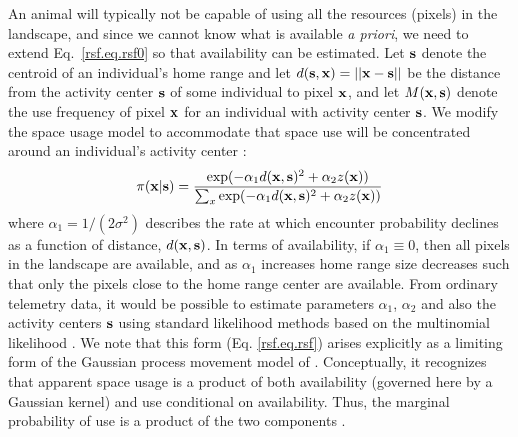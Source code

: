 \documentclass[12pt]{article}
\begin{document}
An animal will typically not be capable of using all the
resources (pixels) in the landscape, and since we cannot know what is
available \textit{a priori}, we need to extend
Eq.~\ref{rsf.eq.rsf0} so that availability can be estimated.
Let ${\bf s}$ denote the
centroid of an individual's home range and let $d({\bf s},{\bf x}) =
||{\bf x} - {\bf s}||$ be the distance from the activity center
${\bf s}$ of some individual to pixel ${\bf x}$, and let $M({\bf
  x},{\bf s})$ denote the use frequency of pixel ${\bf x}$ for an
individual with activity center ${\bf s}$.  We modify the space usage
model to accommodate that space use will be concentrated around an
individual's activity center 
\citep{johnson_etal:2008,forester_etal:2009}:
\begin{equation}
 \pi({\bf x}|{\bf s})  = \frac{ \exp( -\alpha_{1} d({\bf x},{\bf s})^{2} +\alpha_{2} z({\bf x}) )}
{ \sum_{x} \exp(-\alpha_{1} d({\bf x},{\bf s})^{2} +\alpha_{2} z({\bf x}))}
\label{rsf.eq.rsf}
\end{equation}
where $\alpha_1=1/(2\sigma^2)$ describes the rate at which encounter
probability declines as a function of distance, $d({\bf x},{\bf
  s})$. In terms of availability, if $\alpha_1 \equiv 0$, then all
pixels in the landscape are available, and as $\alpha_1$ increases
home range size decreases such that only the pixels close to the home
range center are available.
From ordinary telemetry data, it would be possible to estimate
parameters $\alpha_{1}$, $\alpha_{2}$ and also the activity centers
${\bf s}$ using standard likelihood methods based on the multinomial
likelihood \citep{johnson_etal:2008}.  We note that this form
(Eq. \ref{rsf.eq.rsf}) arises explicitly as a limiting form of the
Gaussian process movement model of
\citet{johnson_etal:2008}. Conceptually, it recognizes that apparent
space usage is a product of both availability (governed here by a
Gaussian kernel) and use conditional on availability. Thus, the
marginal probability of use is a product of the two components
\citep{johnson_etal:2008, forester_etal:2009}.
\end{document}
